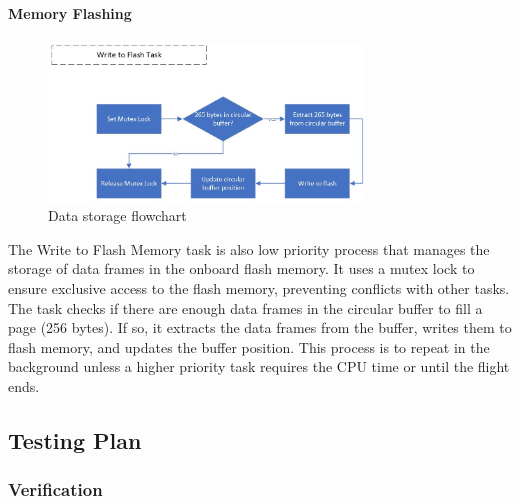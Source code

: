 \paragraph{Memory Flashing}
\begin{figure}[ht!]
  \begin{center}
    \hspace{-1.5cm}\includegraphics[width=0.75\textwidth]{./img/Section_4_2_2_5.jpeg}
  \end{center}
  \caption{Data storage flowchart}\label{fig:flowchart-flash}
\end{figure}

The Write to Flash Memory task is also low priority process that manages the storage of data frames in the onboard flash memory. It uses a mutex lock to ensure exclusive access to the flash memory, preventing conflicts with other tasks. The task checks if there are enough data frames in the circular buffer to fill a page (256 bytes). If so, it extracts the data frames from the buffer, writes them to flash memory, and updates the buffer position. This process is to repeat in the background unless a higher priority task requires the CPU time or until the flight ends.  

\subsection{Testing Plan}
\subsubsection{Verification}
\let\olditemize=\itemize \let\endolditemize=\enditemize \renewenvironment{itemize}{\olditemize \itemsep-0.5em}{\endolditemize}

